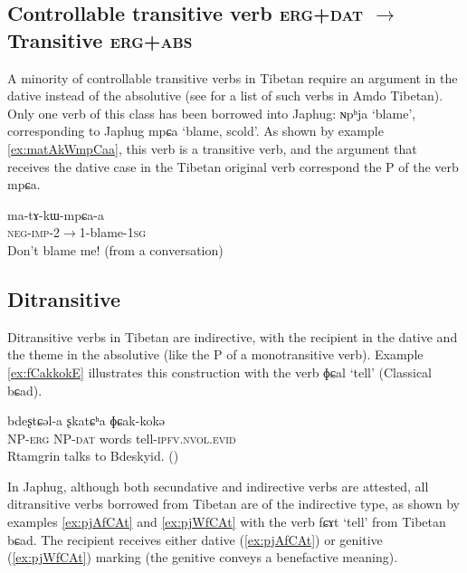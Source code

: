 \documentclass[oldfontcommands,oneside,a4paper,11pt]{article}
\newcommand{\ipa}[1]{{\phon \mbox{#1}}} %
\begin{document}
\subsection{Controllable transitive verb \textsc{erg+dat}  $\rightarrow$ Transitive \textsc{erg+abs} }
A minority of controllable transitive verbs in Tibetan require an argument in the dative instead of the absolutive (see \citealt[111]{haller04themchen} for a list of such verbs in Amdo Tibetan). Only one verb of this class has been borrowed into Japhug: \ipa{ɴpʰja} `blame', corresponding to Japhug \ipa{mpɕa} `blame, scold'. As shown by example \ref{ex:matAkWmpCaa}, this verb is a transitive verb, and the argument that receives the dative case in the Tibetan original verb correspond the P of the verb \ipa{mpɕa}.

\begin{exe}
\ex \label{ex:matAkWmpCaa}
\gll
  \ipa{ma-tɤ-kɯ-mpɕa-a} \\
  \textsc{neg-imp}-2$\rightarrow$1-blame-\textsc{1sg} \\
\glt Don't blame me! (from a conversation)
\end{exe}
  
  \subsection{Ditransitive}
Ditransitive verbs in Tibetan are indirective, with the recipient in the dative and the theme in the absolutive (like the P of a monotransitive verb). Example \ref{ex:fCakkokE} illustrates this construction with the verb \ipa{ɸɕal} `tell' (Classical \ipa{bɕad}).

\begin{exe}
\ex \label{ex:fCakkokE}
\gll \ipa{ʂtamɖʐən-ɣə}  \ipa{bdeʂtɕəl-a} \ipa{ʂkatɕʰa} \ipa{ɸɕak-kokə} \\
NP-\textsc{erg} NP-\textsc{dat} words tell-\textsc{ipfv.nvol.evid} \\
\glt Rtamgrin talks to Bdeskyid. (\citealt[87:195]{haller04themchen})
\end{exe}

In Japhug, although both secundative and indirective verbs are attested, all ditransitive verbs borrowed from Tibetan are of the indirective type, as shown by examples \ref{ex:pjAfCAt} and \ref{ex:pjWfCAt} with the verb \ipa{fɕɤt} `tell' from Tibetan \ipa{bɕad}. The recipient receives either dative (\ref{ex:pjAfCAt}) or genitive (\ref{ex:pjWfCAt}) marking (the genitive conveys a benefactive meaning).
\end{document}
